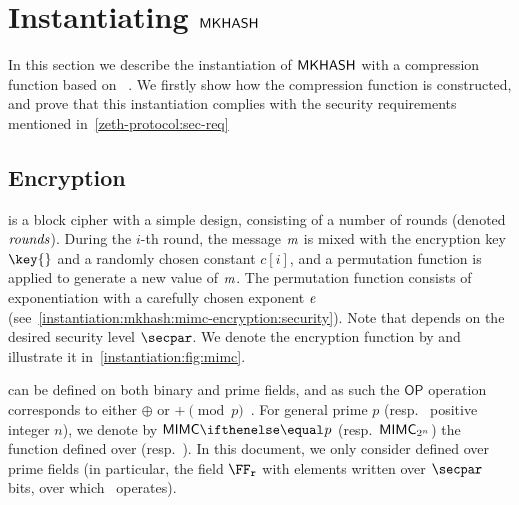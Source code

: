 
\section{Instantiating $\mathsf{MKHASH}$}\label{instantiation:mkhash}

In this section we describe the instantiation of $\mathsf{MKHASH}$ with a compression function based on \mimc{}~\cite{albrecht2016mimc}. We firstly show how the compression function is constructed, and prove that this instantiation complies with the security requirements mentioned in~\cref{zeth-protocol:sec-req}

\subsection{\mimc{} Encryption}\label{instantiation:mkhash:mimc-encryption}

\mimc{} is a block cipher with a simple design, consisting of a number of rounds (denoted $\mathit{rounds}$). During the $i$-th round, the message $\mathit{m}$ is mixed with the encryption key $\key{}$ and a randomly chosen constant $c[i]$, and a permutation function is applied to generate a new value of $\mathit{m}$. The permutation function consists of exponentiation with a carefully chosen exponent $\mathit{e}{}$ (see~\cref{instantiation:mkhash:mimc-encryption:security}). Note that \rounds{} depends on the desired security level $\secpar$. We denote the encryption function by \mimcEnc{} and illustrate it in~\cref{instantiation:fig:mimc}.

\begin{figure*}[ht]
    \centering
    \caption{\mimc{} Encryption function.}\label{instantiation:fig:mimc}
\end{figure*}

\mimcEnc{} can be defined on both binary and prime fields, and as such the $\mathsf{OP}$ operation corresponds to either $\oplus$ or $+ \pmod{p}$~\cite{albrecht2016mimc, grassi2016mpc}.
For general prime $p$ (resp.~ positive integer $n$), we denote by $\mimcPrime{p}$ (resp.~$\mathsf{MIMC{}}_{2^n}$) the \mimcEnc{} function defined over  (resp.~). In this document, we only consider \mimc{} defined over prime fields (in particular, the field $\FFx{\rCURVE}$ with elements written over $\secpar$ bits, over which \zksnark~operates).

